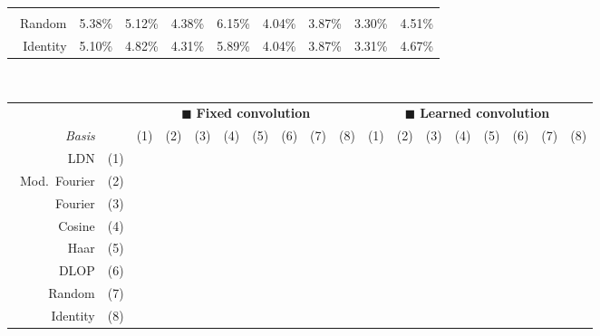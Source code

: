 \begin{table}[p]
\begin{tabular}{r  r r r r  r r r r}
	 \cellcolor{CornflowerBlue!25}{3.16\%} &
	 \cellcolor{CornflowerBlue!75}{4.32\%} \\
	\symFIR~Random &
	5.38\% &
	5.12\% &
	4.38\% &
	6.15\% &
	4.04\% &
	3.87\% &
	3.30\% &
	4.51\% \\
	\symFIR~Identity &
	5.10\% &
	4.82\% &
	4.31\% &
	5.89\% &
	4.04\% &
	3.87\% &
	3.31\% &
	4.67\% \\
	\bottomrule
	\end{tabular}\\[10pt]
	\centering\small\sffamily
	\setlength{\tabcolsep}{4.75pt}
	\begin{tabular}{r r  c c c c c c c c  c c c c c c c c}
	\toprule
	& & \multicolumn{8}{c}{{\color{skyblue1}$\blacksquare$} \textbf{Fixed convolution}}
	& \multicolumn{8}{c}{{\color{aluminium2}$\blacksquare$} \textbf{Learned convolution}} \\
	\cmidrule(r){3-10}\cmidrule(l){11-18}
	\emph{Basis} & & (1) & (2) & (3) & (4) & (5) & (6) & (7) & (8)  & (1) & (2) & (3) & (4) & (5) & (6) & (7) & (8) \\
	\midrule
	\symLTI~LDN & (1) &
	 &
	\sigB &
	 &
	 &
	 &
	 &
	\sigC &
	\sigC &
	 &
	 &
	 &
	 &
	 &
	 &
	 &
	 \\
	\symLTI~Mod.~Fourier & (2) &
	\sigB &
	 &
	 &
	\sigC &
	 &
	\sigB &
	\sigC &
	\sigB &
	 &
	 &
	 &
	 &
	 &
	 &
	 &
	 \\
	\symSDT~Fourier & (3) &
	 &
	 &
	 &
	 &
	 &
	 &
	\sigC &
	\sigC &
	 &
	 &
	 &
	 &
	 &
	 &
	 &
	 \\
	\symSDT~Cosine & (4) &
	 &
	\sigC &
	 &
	 &
	 &
	 &
	\sigC &
	\sigC &
	 &
	 &
	 &
	 &
	 &
	 &
	 &
	 \\
	\symSDT~Haar & (5) &
	 &
	 &
	 &
	 &
	 &
	 &
	\sigC &
	\sigC &
	 &
	 &
	 &
	 &
	 &
	 &
	 &
	 \\
	\symFIR~DLOP & (6) &
	 &
	\sigB &
	 &
	 &
	 &
	 &
	\sigC &
	\sigC &
	 &
	 &
	 &
	 &
	 &
	 &
	 &
	 \\
	\symFIR~Random & (7) &
	\sigC &
	\sigC &
	\sigC &
	\sigC &
	\sigC &
	\sigC &
	 &
	 &
	 &
	 &
	 &
	 &
	 &
	 &
	 &
	 \\
	\symFIR~Identity & (8) &
	\sigC &
	\sigB &
	\sigC &
	\sigC &
	\sigC &
	\sigC &
	 &
	 &
	 &
	 &
	 &
	 &
	 &
	 &
	 &
	 \\
	\bottomrule
	\end{tabular}
\end{table}

